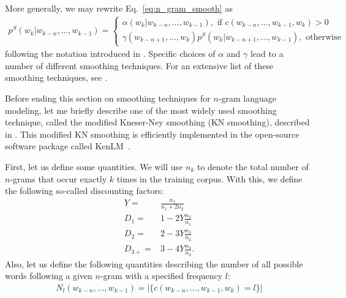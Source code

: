 \documentclass{report}
\begin{document}
More generally, we may rewrite Eq.~\eqref{eq:n_gram_smooth} as
\begin{align}
    \label{eq:n_gram_smoothing_general}
    p^S(w_k | w_{k-n}, \ldots, w_{k-1}) = \left\{ 
        \begin{array}{l}
            \alpha(w_k | w_{k-n}, \ldots, w_{k-1}), \text{ if } c(w_{k-n},
            \ldots, w_{k-1}, w_k) > 0 \\
            \gamma(w_{k-n+1}, \ldots, w_{k}) p^S(w_{k}|w_{k-n+1}, \ldots,
            w_{k-1}), \text{ otherwise}
        \end{array}
        \right.
\end{align}
following the notation introduced in \cite{kneser1995improved}. Specific choices
of $\alpha$ and $\gamma$ lead to a number of different smoothing techniques. For
an extensive list of these smoothing techniques, see \cite{chen1996empirical}.

Before ending this section on smoothing techniques for $n$-gram language
modeling, let me briefly describe one of the most widely used smoothing
technique, called the modified Kneser-Ney smoothing (KN smoothing), described in
\cite{chen1996empirical}. This modified KN smoothing is efficiently implemented
in the open-source software package called KenLM~\cite{Heafield-estimate}.

First, let us define some quantities. We will use $n_k$ to denote the total
number of $n$-grams that occur exactly $k$ times in the training corpus. With
this, we define the following so-called discounting factors:
\begin{align*}
    Y =& \frac{n_1}{n_1 + 2 n_2} \\
    D_1 =& 1 - 2 Y \frac{n_2}{n_1} \\
    D_2 =& 2 - 3 Y \frac{n_3}{n_2} \\
    D_{3+} =& 3 - 4 Y \frac{n_4}{n_3}.
\end{align*}
Also, let us define the following quantities describing the number of all
possible words following a given $n$-gram with a specified frequency $l$:
\begin{align*}
    N_l(w_{k-n}, \ldots, w_{k-1}) = |\{ c(w_{k-n}, \ldots, w_{k-1}, w_k) = l \}|
\end{align*}
\end{document}
